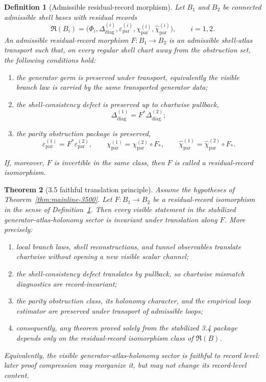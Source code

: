 \documentclass[12pt,a4paper]{article}
\newtheorem{theorem}{Theorem}[section]
\newtheorem{definition}[theorem]{Definition}
\begin{document}
\begin{definition}[Admissible residual-record morphism]
\label{def:mainline-3501}
Let $B_1$ and $B_2$ be connected admissible shell bases with residual records
\[
 \mathfrak R(B_i)=\bigl(\Phi_i,\Delta^{(i)}_{\mathrm{diag}},\varepsilon^{(i)}_{\mathrm{par}},\chi^{(i)}_{\mathrm{par}},\widehat\chi^{(i)}_{\mathrm{par}}\bigr),
 \qquad i=1,2.
\]
An \emph{admissible residual-record morphism} $F:B_1\to B_2$ is an admissible shell-atlas transport such that, on every regular shell chart away from the obstruction set, the following conditions hold:
\begin{enumerate}[label=(\roman*), leftmargin=2em]
 \item the generator germ is preserved under transport, equivalently the visible branch law is carried by the same transported generator data;
 \item the shell-consistency defect is preserved up to chartwise pullback,
 \[
 \Delta^{(1)}_{\mathrm{diag}} = F^*\Delta^{(2)}_{\mathrm{diag}};
 \]
 \item the parity obstruction package is preserved,
 \[
 \varepsilon^{(1)}_{\mathrm{par}} = F^*\varepsilon^{(2)}_{\mathrm{par}},
 \qquad
 \chi^{(1)}_{\mathrm{par}} = \chi^{(2)}_{\mathrm{par}}\circ F_*,
 \qquad
 \widehat\chi^{(1)}_{\mathrm{par}} = \widehat\chi^{(2)}_{\mathrm{par}}\circ F_*.
 \]
\end{enumerate}
If, moreover, $F$ is invertible in the same class, then $F$ is called a \emph{residual-record isomorphism}.
\end{definition}

\begin{theorem}[3.5 faithful translation principle]
\label{thm:mainline-3501}
Assume the hypotheses of Theorem~\ref{thm:mainline-3500}. Let $F:B_1\to B_2$ be a residual-record isomorphism in the sense of Definition~\ref{def:mainline-3501}. Then every visible statement in the stabilized generator-atlas-holonomy sector is invariant under translation along $F$. More precisely:
\begin{enumerate}[label=(\roman*), leftmargin=2em]
 \item local branch laws, shell reconstructions, and tunnel observables translate chartwise without opening a new visible scalar channel;
 \item the shell-consistency defect translates by pullback, so chartwise mismatch diagnostics are record-invariant;
 \item the parity obstruction class, its holonomy character, and the empirical loop estimator are preserved under transport of admissible loops;
 \item consequently, any theorem proved solely from the stabilized 3.4 package depends only on the residual-record isomorphism class of $\mathfrak R(B)$.
\end{enumerate}
Equivalently, the visible generator-atlas-holonomy sector is faithful to record level: later proof compression may reorganize it, but may not change its record-level content.
\end{theorem}
\end{document}
